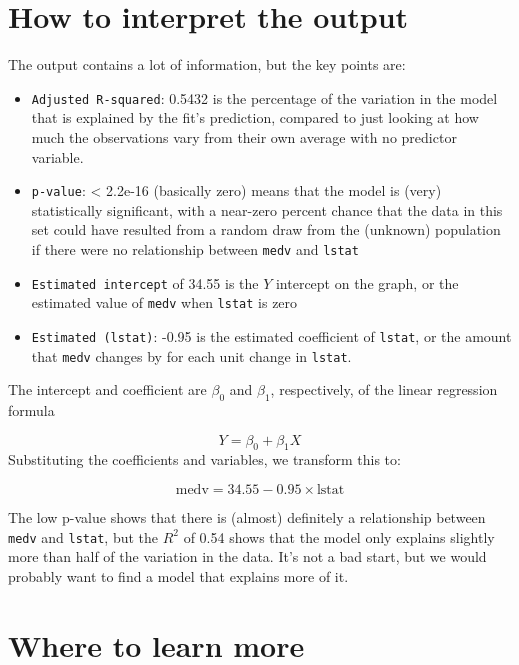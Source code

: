 \documentclass[
]{book}
\providecommand{\tightlist}{%
  \setlength{\itemsep}{0pt}\setlength{\parskip}{0pt}}
\begin{document}
\hypertarget{how-to-interpret-the-output}{%
\section{How to interpret the output}\label{how-to-interpret-the-output}}

The output contains a lot of information, but the key points are:

\begin{itemize}
\tightlist
\item
  \texttt{Adjusted\ R-squared}: 0.5432 is the percentage of the variation in the model that is explained by the fit's prediction, compared to just looking at how much the observations vary from their own average with no predictor variable.
\item
  \texttt{p-value}: \textless{} 2.2e-16 (basically zero) means that the model is (very) statistically significant, with a near-zero percent chance that the data in this set could have resulted from a random draw from the (unknown) population if there were no relationship between \texttt{medv} and \texttt{lstat}
\item
  \texttt{Estimated\ intercept} of 34.55 is the \(Y\) intercept on the graph, or the estimated value of \texttt{medv} when \texttt{lstat} is zero
\item
  \texttt{Estimated\ (lstat)}: -0.95 is the estimated coefficient of \texttt{lstat}, or the amount that \texttt{medv} changes by for each unit change in \texttt{lstat}.
\end{itemize}

The intercept and coefficient are \(\beta_0\) and \(\beta_1\), respectively, of the linear regression formula

\[Y = \beta_0 + \beta_1X\]
Substituting the coefficients and variables, we transform this to:

\[\text{medv} = 34.55 - 0.95 \times \text{lstat}\]

The low p-value shows that there is (almost) definitely a relationship between \texttt{medv} and \texttt{lstat}, but the \(R^2\) of 0.54 shows that the model only explains slightly more than half of the variation in the data. It's not a bad start, but we would probably want to find a model that explains more of it.

\hypertarget{where-to-learn-more}{%
\section{Where to learn more}\label{where-to-learn-more}}
\end{document}
